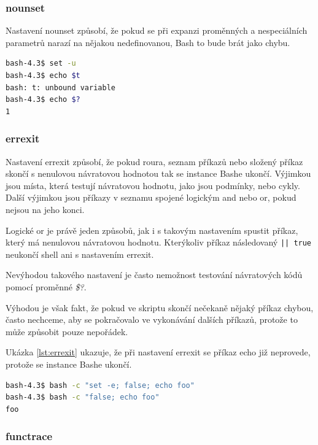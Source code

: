 \documentclass[thesis=M,czech]{FITthesis}[2012/06/26]
\begin{document}
\subsubsection{nounset}

Nastavení nounset způsobí, že pokud se při expanzi proměnných a nespeciálních parametrů narazí na nějakou nedefinovanou, Bash to bude brát jako chybu.

\begin{lstlisting}[language=bash, caption={nounset}, label={lst:unbound}]
bash-4.3$ set -u
bash-4.3$ echo $t
bash: t: unbound variable
bash-4.3$ echo $?
1
\end{lstlisting}


\subsubsection{errexit}

Nastavení errexit způsobí, že pokud roura, seznam příkazů nebo složený příkaz skončí s nenulovou návratovou hodnotou tak se instance Bashe ukončí. Výjimkou jsou místa, která testují návratovou hodnotu, jako jsou podmínky, nebo cykly. Další výjimkou jsou příkazy v seznamu spojené logickým and nebo or, pokud nejsou na jeho konci.

Logické or je právě jeden způsobů, jak i s takovým nastavením spustit příkaz, který má nenulovou návratovou hodnotu. Kterýkoliv příkaz následovaný \texttt{|| true} neukončí shell ani s nastavením errexit.

Nevýhodou takového nastavení je často nemožnost testování návratových kódů pomocí proměnné \textit{\$?}.

Výhodou je však fakt, že pokud ve skriptu skončí nečekaně nějaký příkaz chybou, často nechceme, aby se pokračovalo ve vykonávání dalších příkazů, protože to může způsobit pouze nepořádek.

Ukázka \ref{lst:errexit} ukazuje, že při nastavení errexit se příkaz echo již neprovede, protože se instance Bashe ukončí.

\begin{lstlisting}[language=bash, caption={errexit}, label={lst:errexit}]
bash-4.3$ bash -c "set -e; false; echo foo"
bash-4.3$ bash -c "false; echo foo"
foo
\end{lstlisting}

%
%
%
\subsubsection{functrace}
\end{document}
